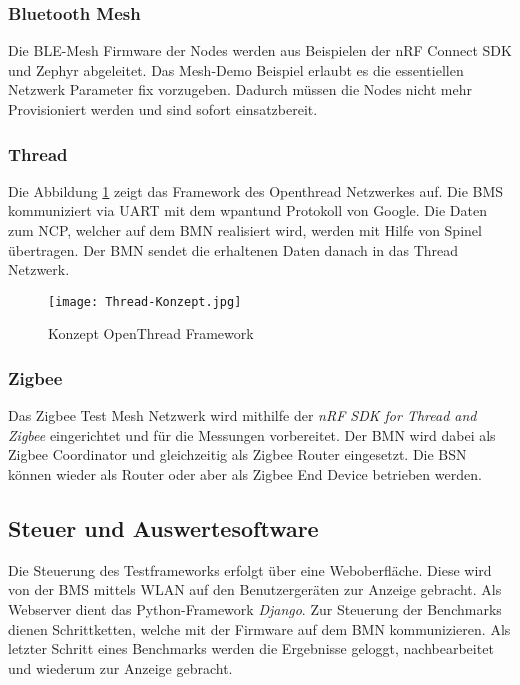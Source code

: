 \subsubsection{Bluetooth Mesh}\label{subsubsection:Bluetooth Mesh}

Die BLE-Mesh Firmware der Nodes werden aus Beispielen der nRF Connect SDK und Zephyr abgeleitet. Das Mesh-Demo Beispiel erlaubt es die essentiellen Netzwerk Parameter fix vorzugeben. Dadurch müssen die Nodes nicht mehr Provisioniert werden und sind sofort einsatzbereit.

\newpage
\subsubsection{Thread}\label{subsubsection:Thread} 
Die Abbildung \ref{fig:ThreadKonzept} zeigt das Framework des Openthread Netzwerkes auf. Die BMS kommuniziert via UART mit dem wpantund Protokoll von Google. Die Daten zum NCP, welcher auf dem BMN realisiert wird, werden mit Hilfe von Spinel übertragen. Der BMN sendet die erhaltenen Daten danach in das Thread Netzwerk.

\begin{figure}[H]
	\centering
	\texttt{[image: Thread-Konzept.jpg]}
	\caption{Konzept OpenThread Framework}\label{fig:ThreadKonzept}
\end{figure}



\subsubsection{Zigbee}\label{subsubsection:Zigbee}
Das Zigbee Test Mesh Netzwerk wird mithilfe der \textit{nRF SDK for Thread and Zigbee} eingerichtet und für die Messungen vorbereitet. Der BMN wird dabei als Zigbee Coordinator und gleichzeitig als Zigbee Router eingesetzt. Die BSN können wieder als Router oder aber als Zigbee End Device betrieben werden.


\subsection{Steuer und Auswertesoftware}\label{subsec:SteuerundAuswertesoftware}
Die Steuerung des Testframeworks erfolgt über eine Weboberfläche. Diese wird von der BMS mittels WLAN auf den Benutzergeräten zur Anzeige gebracht. Als Webserver dient das Python-Framework \textit{Django}. Zur Steuerung der Benchmarks dienen Schrittketten, welche mit der Firmware auf dem BMN kommunizieren. Als letzter Schritt eines Benchmarks werden die Ergebnisse geloggt, nachbearbeitet und wiederum zur Anzeige gebracht.

